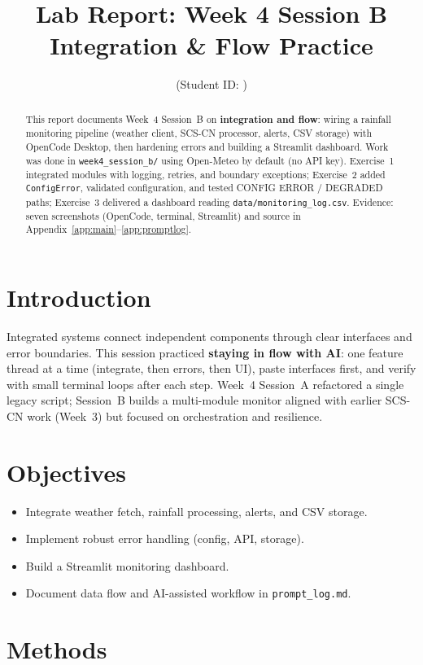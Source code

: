 \documentclass[11pt,a4paper]{article}
\title{Lab Report: Week 4 Session B\\Integration \& Flow Practice}
\author{\studentname \quad (Student ID: \studentid)}
\date{\reportdate}
\begin{document}
\maketitle

\begin{abstract}
This report documents Week~4 Session~B on \textbf{integration and flow}: wiring a rainfall monitoring pipeline (weather client, SCS-CN processor, alerts, CSV storage) with OpenCode Desktop, then hardening errors and building a Streamlit dashboard. Work was done in \texttt{week4\_session\_b/} using Open-Meteo by default (no API key). Exercise~1 integrated modules with logging, retries, and boundary exceptions; Exercise~2 added \texttt{ConfigError}, validated configuration, and tested CONFIG ERROR / DEGRADED paths; Exercise~3 delivered a dashboard reading \texttt{data/monitoring\_log.csv}. Evidence: seven screenshots (OpenCode, terminal, Streamlit) and source in Appendix~\ref{app:main}--\ref{app:promptlog}.
\end{abstract}

\section{Introduction}
Integrated systems connect independent components through clear interfaces and error boundaries. This session practiced \textbf{staying in flow with AI}: one feature thread at a time (integrate, then errors, then UI), paste interfaces first, and verify with small terminal loops after each step. Week~4 Session~A refactored a single legacy script; Session~B builds a multi-module monitor aligned with earlier SCS-CN work (Week~3) but focused on orchestration and resilience.

\section{Objectives}
\begin{itemize}[noitemsep]
  \item Integrate weather fetch, rainfall processing, alerts, and CSV storage.
  \item Implement robust error handling (config, API, storage).
  \item Build a Streamlit monitoring dashboard.
  \item Document data flow and AI-assisted workflow in \texttt{prompt\_log.md}.
\end{itemize}

\section{Methods}
\end{document}
